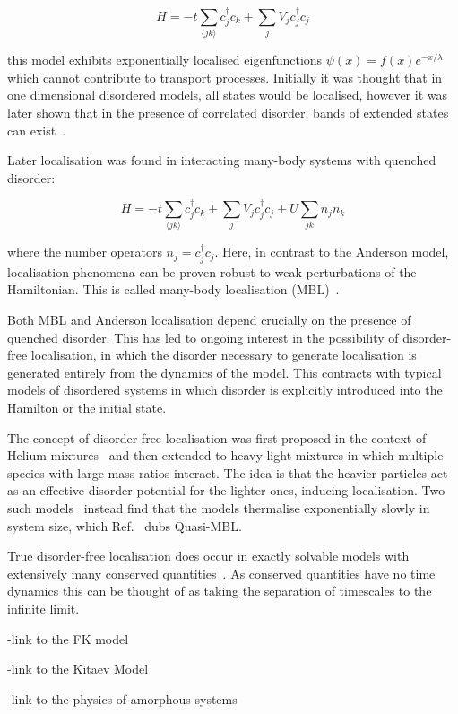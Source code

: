 \[
H = -t\sum_{\langle jk \rangle} c^\dagger_j c_k + \sum_j V_j c_j^\dagger c_j
\]

this model exhibits exponentially localised eigenfunctions \(\psi(x) = f(x) e^{-x/\lambda}\) which cannot contribute to transport processes. Initially it was thought that in one dimensional disordered models, all states would be localised, however it was later shown that in the presence of correlated disorder, bands of extended states can exist~\autocite{izrailevLocalizationMobilityEdge1999,croyAndersonLocalization1D2011,izrailevAnomalousLocalizationLowDimensional2012}.

Later localisation was found in interacting many-body systems with quenched disorder:

\[
H = -t\sum_{\langle jk \rangle} c^\dagger_j c_k + \sum_j V_j c_j^\dagger c_j + U\sum_{jk} n_j n_k
\]

where the number operators \(n_j = c^\dagger_j c_j\). Here, in contrast to the Anderson model, localisation phenomena can be proven robust to weak perturbations of the Hamiltonian. This is called many-body localisation (MBL)~\autocite{imbrieManyBodyLocalizationQuantum2016}.

Both MBL and Anderson localisation depend crucially on the presence of quenched disorder. This has led to ongoing interest in the possibility of disorder-free localisation, in which the disorder necessary to generate localisation is generated entirely from the dynamics of the model. This contracts with typical models of disordered systems in which disorder is explicitly introduced into the Hamilton or the initial state.

The concept of disorder-free localisation was first proposed in the context of Helium mixtures~\autocite{kagan1984localization} and then extended to heavy-light mixtures in which multiple species with large mass ratios interact. The idea is that the heavier particles act as an effective disorder potential for the lighter ones, inducing localisation. Two such models~\autocite{yaoQuasiManyBodyLocalizationTranslationInvariant2016,schiulazDynamicsManybodyLocalized2015} instead find that the models thermalise exponentially slowly in system size, which Ref.~\autocite{yaoQuasiManyBodyLocalizationTranslationInvariant2016} dubs Quasi-MBL.

True disorder-free localisation does occur in exactly solvable models with extensively many conserved quantities~\autocite{smithDisorderFreeLocalization2017}. As conserved quantities have no time dynamics this can be thought of as taking the separation of timescales to the infinite limit.

-link to the FK model

-link to the Kitaev Model

-link to the physics of amorphous systems
